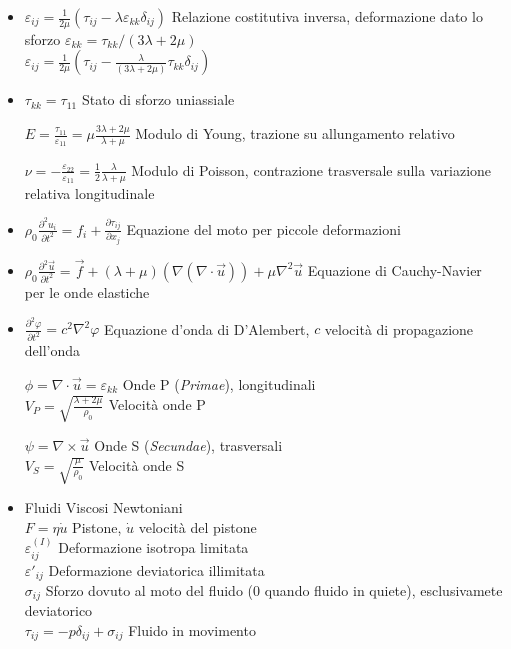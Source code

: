 \documentclass[a4paper]{article}
\begin{document}
\begin{itemize}
	\item $\varepsilon_{ij}=\frac{1}{2 \mu} (\tau_{ij}-\lambda \varepsilon_{kk} \delta_{ij})$ Relazione costitutiva inversa, deformazione dato lo sforzo	
	$\varepsilon_{kk}=\tau_{kk}/(3\lambda+2\mu)$\\
	$\varepsilon_{ij}=\frac{1}{2 \mu} (\tau_{ij}-  \frac{\lambda }{(3\lambda+2\mu)} \tau_{kk} \delta_{ij})$
	
	\item $\tau_{kk}=\tau_{11}$ Stato di sforzo uniassiale
	
	$E=\frac{\tau_{11}}{\varepsilon_{11}}=\mu \frac{3\lambda + 2\mu}{\lambda + \mu}$ Modulo di Young, trazione su allungamento relativo
	
	$\nu=-\frac{\varepsilon_{22}}{\varepsilon_{11}}=\frac{1}{2}\frac{\lambda}{\lambda+ \mu}$ Modulo di Poisson, contrazione trasversale sulla variazione relativa longitudinale
	
	\item $\rho_0 \frac{\partial^2 u_i}{\partial t^2} =f_i+ \frac{\partial \tau_{ij}}{\partial x_j} $ Equazione del moto per piccole deformazioni
	
	\item $\rho_0 \frac{\partial^2 \overrightarrow{u}}{\partial t^2} = \overrightarrow{f}+ (\lambda+\mu) (\nabla(\nabla \cdot \overrightarrow{u}))+\mu \nabla^2 \overrightarrow{u} $ Equazione di Cauchy-Navier per le onde elastiche
	
	\item $\frac{\partial^2 \varphi}{\partial t^2}=c^2 \nabla^2 \varphi$ Equazione d'onda di D'Alembert, $c$ velocità di propagazione dell'onda
	
	$\phi=\nabla \cdot \overrightarrow{u} = \varepsilon_{kk}$ Onde P (\textit{Primae}), longitudinali\\
	$V_P= \sqrt{\frac{\lambda+2\mu}{\rho_0}}$ Velocità onde P
	
	$\psi = \nabla \times \overrightarrow{u}$ Onde S (\textit{Secundae}), trasversali\\
	$V_S = \sqrt{\frac{\mu}{\rho_0}}$ Velocità onde S
	
	\item Fluidi  Viscosi Newtoniani\\
	$F = \eta \dot{u}$ Pistone, $\dot{u}$ velocità del pistone\\
	$\varepsilon^{(I)}_{ij}$ Deformazione isotropa limitata\\
	$\varepsilon'_{ij}$ Deformazione deviatorica illimitata\\
	$\sigma_{ij}$ Sforzo dovuto al moto del fluido (0 quando fluido in quiete), esclusivamete deviatorico\\
	$\tau_{ij}=-p \delta_{ij}+\sigma_{ij}$ Fluido in movimento
	

\end{itemize}
\end{document}
